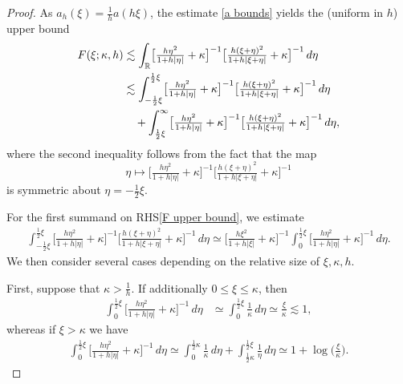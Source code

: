 \documentclass{amsart}
\newcommand{\R}{{\mathbb{R}}}
\theoremstyle{definition}
\theoremstyle{remark}
\begin{document}
\begin{proof}
As \(a_h(\xi) = \frac1ha(h\xi)\), the estimate \eqref{a bounds} yields the (uniform in \(h\)) upper bound
\begin{align}
F(\xi;\kappa,h) &\lesssim \int_\R \bigl[\tfrac{h\eta^2}{1+h|\eta|} +\kappa\bigr]^{-1}\bigl[\tfrac{h(\xi+\eta)^2}{1+h|\xi+\eta|} + \kappa\bigr]^{-1} \,d\eta\notag\\
&\lesssim \int_{-\frac12\xi}^{\frac12\xi} \bigl[\tfrac{h\eta^2}{1+h|\eta|} +\kappa\bigr]^{-1}\bigl[\tfrac{h(\xi+\eta)^2}{1+h|\xi+\eta|} + \kappa\bigr]^{-1} \,d\eta\label{F upper bound}\\
&\quad  + \int_{\frac12\xi}^\infty \bigl[\tfrac{h\eta^2}{1+h|\eta|} +\kappa\bigr]^{-1}\bigl[\tfrac{h(\xi+\eta)^2}{1+h|\xi+\eta|} + \kappa\bigr]^{-1} \,d\eta,\notag
\end{align}
where the second inequality follows from the fact that the map
\[
\eta\mapsto \bigl[\tfrac{h\eta^2}{1+h|\eta|} +\kappa\bigr]^{-1}\bigl[\tfrac{h(\xi+\eta)^2}{1+h|\xi+\eta|} + \kappa\bigr]^{-1}
\]
is symmetric about \(\eta = -\frac12\xi\).


For the first summand on RHS\eqref{F upper bound}, we estimate
\begin{align*}
\int_{-\frac12\xi}^{\frac12\xi}\bigl[\tfrac{h\eta^2}{1+h|\eta|} +\kappa\bigr]^{-1}\bigl[\tfrac{h(\xi+\eta)^2}{1+h|\xi+\eta|} + \kappa\bigr]^{-1} \,d\eta \simeq \bigl[\tfrac{h\xi^2}{1+h|\xi|} +\kappa\bigr]^{-1}\int_0^{\frac12\xi}\bigl[\tfrac{h\eta^2}{1+h|\eta|} +\kappa\bigr]^{-1}\,d\eta.
\end{align*}
We then consider several cases depending on the relative size of \(\xi,\kappa,h\).

First, suppose that \(\kappa>\frac1h\). If additionally \(0\leq\xi\leq \kappa\), then
\begin{align*}
\int_0^{\frac12\xi}\bigl[\tfrac{h\eta^2}{1+h|\eta|} +\kappa\bigr]^{-1}\,d\eta&\simeq \int_0^{\frac12\xi}\tfrac1\kappa\,d\eta\simeq \tfrac\xi\kappa\lesssim 1,
\end{align*}
whereas if \(\xi>\kappa\) we have
\begin{align*}
\int_0^{\frac12\xi}\bigl[\tfrac{h\eta^2}{1+h|\eta|} +\kappa\bigr]^{-1}\,d\eta\simeq \int_0^{\frac12\kappa}\tfrac1\kappa\,d\eta + \int_{\frac12\kappa}^{\frac12\xi}\tfrac1\eta\,d\eta\simeq 1 + \log\bigl(\tfrac\xi\kappa\bigr).
\end{align*}


\end{proof}
\end{document}

